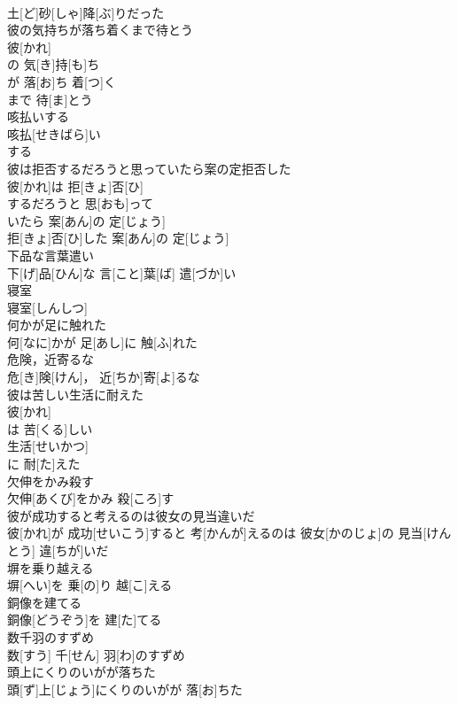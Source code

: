 \documentclass[8pt]{extreport}
\begin{document}
\begin{CJK}{UTF8}{min}
\\	土[ど]砂[しゃ]降[ぶ]りだった
\\	彼の気持ちが落ち着くまで待とう	
\\	彼[かれ]
\\	の 気[き]持[も]ち 
\\	が 落[お]ち 着[つ]く 
\\	まで 待[ま]とう 
\\	咳払いする	
\\	咳払[せきばら]い 
\\	する
\\	彼は拒否するだろうと思っていたら案の定拒否した	
\\	彼[かれ]は 拒[きょ]否[ひ]
\\	するだろうと 思[おも]って 
\\	いたら 案[あん]の 定[じょう]
\\	拒[きょ]否[ひ]した 案[あん]の 定[じょう]
\\	下品な言葉遣い	
\\	下[げ]品[ひん]な 言[こと]葉[ば] 遣[づか]い
\\	寝室	
\\	寝室[しんしつ]
\\	何かが足に触れた	
\\	何[なに]かが 足[あし]に 触[ふ]れた
\\	危険，近寄るな	
\\	危[き]険[けん]， 近[ちか]寄[よ]るな
\\	彼は苦しい生活に耐えた	
\\	彼[かれ]
\\	は 苦[くる]しい 
\\	生活[せいかつ]
\\	に 耐[た]えた 
\\	欠伸をかみ殺す	
\\	欠伸[あくび]をかみ 殺[ころ]す 
\\	彼が成功すると考えるのは彼女の見当違いだ	
\\	彼[かれ]が 成功[せいこう]すると 考[かんが]えるのは 彼女[かのじょ]の 見当[けんとう] 違[ちが]いだ
\\	塀を乗り越える	
\\	塀[へい]を 乗[の]り 越[こ]える
\\	銅像を建てる	
\\	銅像[どうぞう]を 建[た]てる
\\	数千羽のすずめ	
\\	数[すう] 千[せん] 羽[わ]のすずめ
\\	頭上にくりのいがが落ちた	
\\	頭[ず]上[じょう]にくりのいがが 落[お]ちた

\end{CJK}
\end{document}
